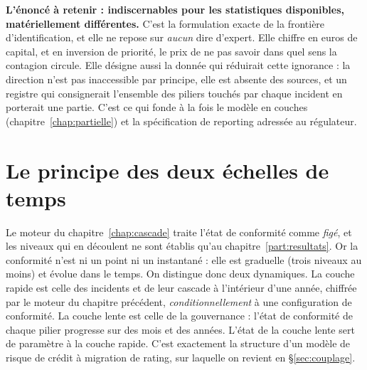 \begin{cle}
\textbf{L'énoncé à retenir : indiscernables pour les statistiques disponibles, matériellement
différentes.} C'est la formulation exacte de la frontière d'identification, et elle ne repose sur
\emph{aucun} dire d'expert. Elle chiffre en euros de capital, et en inversion de priorité, le
prix de ne pas savoir dans quel sens la contagion circule. Elle désigne aussi la donnée qui
réduirait cette ignorance : la direction n'est pas inaccessible par principe, elle est absente
des sources, et un registre qui consignerait l'ensemble des piliers touchés par chaque incident
en porterait une partie. C'est ce qui fonde à la fois le modèle en couches
(chapitre~\ref{chap:partielle}) et la spécification de reporting adressée au régulateur.
\end{cle}



\section{Le principe des deux échelles de temps}

Le moteur du chapitre~\ref{chap:cascade} traite l'état de conformité
comme \emph{figé}, et les niveaux qui en découlent ne sont établis qu'au
chapitre~\ref{part:resultats}. Or la
conformité n'est ni un point ni un instantané : elle est graduelle (trois niveaux au moins) et
évolue dans le temps. On distingue donc deux dynamiques. La couche rapide est celle des
incidents et de leur cascade à l'intérieur d'une année, chiffrée par le moteur du
chapitre précédent, \emph{conditionnellement} à une configuration de conformité. La couche
lente est celle de la gouvernance : l'état de conformité de chaque pilier progresse sur des
mois et des années. L'état de la couche lente sert de paramètre à la couche rapide.
C'est exactement la structure d'un modèle de risque de crédit à migration de rating, sur
laquelle on revient en \S\ref{sec:couplage}.

